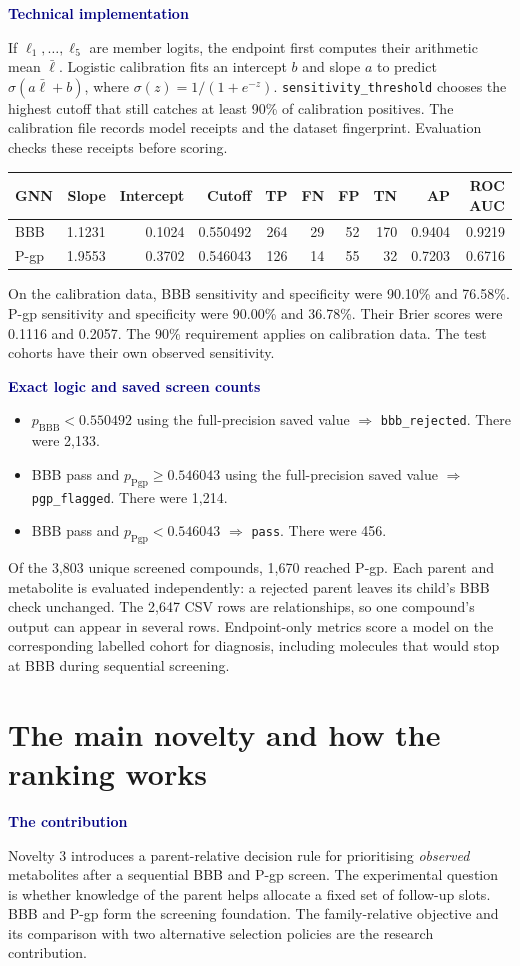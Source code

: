 \documentclass[11pt,a4paper]{article}
\newcommand{\code}[1]{\nolinkurl{#1}}
\newcommand{\lead}[1]{\par\smallskip\textbf{\textcolor{Navy}{#1}}\par\nobreak}
\newcommand{\pagehead}[1]{\clearpage\section{#1}}
\newenvironment{compact}{\begin{itemize}[leftmargin=*,topsep=2pt,itemsep=1pt,parsep=0pt]}{\end{itemize}}
\newcommand{\dense}{\small\renewcommand{\arraystretch}{1.11}\setlength{\tabcolsep}{4pt}}
\begin{document}
\lead{Technical implementation}
If $\ell_1,\ldots,\ell_5$ are member logits, the endpoint first computes their arithmetic mean $\bar{\ell}$. Logistic calibration fits an intercept $b$ and slope $a$ to predict $\sigma(a\bar{\ell}+b)$, where $\sigma(z)=1/(1+e^{-z})$. \code{sensitivity_threshold} chooses the highest cutoff that still catches at least 90\% of calibration positives. The calibration file records model receipts and the dataset fingerprint. Evaluation checks these receipts before scoring.

{\dense
\begin{tabularx}{\linewidth}{Yrrrrrrrrr}
\toprule
GNN & Slope & Intercept & Cutoff & TP & FN & FP & TN & AP & ROC AUC\\
\midrule
BBB & 1.1231 & 0.1024 & 0.550492 & 264 & 29 & 52 & 170 & 0.9404 & 0.9219\\
P-gp & 1.9553 & 0.3702 & 0.546043 & 126 & 14 & 55 & 32 & 0.7203 & 0.6716\\
\bottomrule
\end{tabularx}}

On the calibration data, BBB sensitivity and specificity were 90.10\% and 76.58\%. P-gp sensitivity and specificity were 90.00\% and 36.78\%. Their Brier scores were 0.1116 and 0.2057. The 90\% requirement applies on calibration data. The test cohorts have their own observed sensitivity.

\lead{Exact logic and saved screen counts}
\begin{compact}
\item $p_{\mathrm{BBB}} < 0.550492$ using the full-precision saved value $\Rightarrow$ \code{bbb_rejected}. There were 2,133.
\item BBB pass and $p_{\mathrm{Pgp}} \ge 0.546043$ using the full-precision saved value $\Rightarrow$ \code{pgp_flagged}. There were 1,214.
\item BBB pass and $p_{\mathrm{Pgp}} < 0.546043$ $\Rightarrow$ \code{pass}. There were 456.
\end{compact}
Of the 3,803 unique screened compounds, 1,670 reached P-gp. Each parent and metabolite is evaluated independently: a rejected parent leaves its child's BBB check unchanged. The 2,647 CSV rows are relationships, so one compound's output can appear in several rows. Endpoint-only metrics score a model on the corresponding labelled cohort for diagnosis, including molecules that would stop at BBB during sequential screening.


\pagehead{The main novelty and how the ranking works}\label{sec:ranking}
\lead{The contribution}
Novelty 3 introduces a parent-relative decision rule for prioritising \emph{observed} metabolites after a sequential BBB and P-gp screen. The experimental question is whether knowledge of the parent helps allocate a fixed set of follow-up slots. BBB and P-gp form the screening foundation. The family-relative objective and its comparison with two alternative selection policies are the research contribution.
\end{document}
